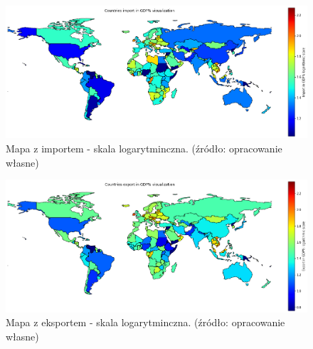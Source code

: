 \documentclass[11pt]{report}
\begin{document}
    \begin{figure}[ht!]
        \centering
        \includegraphics[width=1 \textwidth]{fig/CLUST/import2015.png}
        \caption{Mapa z importem - skala logarytminczna. (źródło: opracowanie własne)}
        \label{fig:clustImport2015_log}
    \end{figure}

    \begin{figure}[ht!]
        \centering
        \includegraphics[width=1 \textwidth]{fig/CLUST/export2015.png}
        \caption{Mapa z eksportem - skala logarytminczna. (źródło: opracowanie własne)}
        \label{fig:clustExport2015_log}
    \end{figure}
\end{document}
